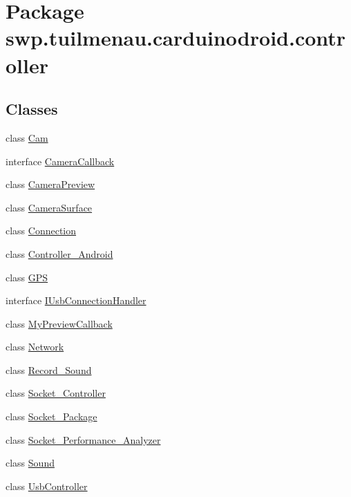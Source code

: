 \hypertarget{namespaceswp_1_1tuilmenau_1_1carduinodroid_1_1controller}{}\section{Package swp.\+tuilmenau.\+carduinodroid.\+controller}
\label{namespaceswp_1_1tuilmenau_1_1carduinodroid_1_1controller}
\subsection*{Classes}
\begin{DoxyCompactItemize}
\item 
class \hyperlink{classswp_1_1tuilmenau_1_1carduinodroid_1_1controller_1_1_cam}{Cam}
\item 
interface \hyperlink{interfaceswp_1_1tuilmenau_1_1carduinodroid_1_1controller_1_1_camera_callback}{Camera\+Callback}
\item 
class \hyperlink{classswp_1_1tuilmenau_1_1carduinodroid_1_1controller_1_1_camera_preview}{Camera\+Preview}
\item 
class \hyperlink{classswp_1_1tuilmenau_1_1carduinodroid_1_1controller_1_1_camera_surface}{Camera\+Surface}
\item 
class \hyperlink{classswp_1_1tuilmenau_1_1carduinodroid_1_1controller_1_1_connection}{Connection}
\item 
class \hyperlink{classswp_1_1tuilmenau_1_1carduinodroid_1_1controller_1_1_controller___android}{Controller\+\_\+\+Android}
\item 
class \hyperlink{classswp_1_1tuilmenau_1_1carduinodroid_1_1controller_1_1_g_p_s}{G\+P\+S}
\item 
interface \hyperlink{interfaceswp_1_1tuilmenau_1_1carduinodroid_1_1controller_1_1_i_usb_connection_handler}{I\+Usb\+Connection\+Handler}
\item 
class \hyperlink{classswp_1_1tuilmenau_1_1carduinodroid_1_1controller_1_1_my_preview_callback}{My\+Preview\+Callback}
\item 
class \hyperlink{classswp_1_1tuilmenau_1_1carduinodroid_1_1controller_1_1_network}{Network}
\item 
class \hyperlink{classswp_1_1tuilmenau_1_1carduinodroid_1_1controller_1_1_record___sound}{Record\+\_\+\+Sound}
\item 
class \hyperlink{classswp_1_1tuilmenau_1_1carduinodroid_1_1controller_1_1_socket___controller}{Socket\+\_\+\+Controller}
\item 
class \hyperlink{classswp_1_1tuilmenau_1_1carduinodroid_1_1controller_1_1_socket___package}{Socket\+\_\+\+Package}
\item 
class \hyperlink{classswp_1_1tuilmenau_1_1carduinodroid_1_1controller_1_1_socket___performance___analyzer}{Socket\+\_\+\+Performance\+\_\+\+Analyzer}
\item 
class \hyperlink{classswp_1_1tuilmenau_1_1carduinodroid_1_1controller_1_1_sound}{Sound}
\item 
class \hyperlink{classswp_1_1tuilmenau_1_1carduinodroid_1_1controller_1_1_usb_controller}{Usb\+Controller}
\end{DoxyCompactItemize}
